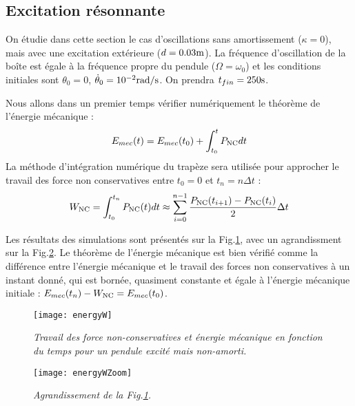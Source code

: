\documentclass[a4paper,12pt,oneside]{article}
\def \be {\begin{equation}}
\def \ee {\end{equation}}
\def \t {\theta}
\def \vt {\Dot{\theta}}
\begin{document}
\subsection{Excitation résonnante}
On étudie dans cette section le cas d'oscillations sans amortissement ($\kappa =0$), mais avec une excitation extérieure ($d=0.03\rm{m}$). La fréquence d'oscillation de la boîte est égale à la fréquence propre du pendule ($\Omega=\omega_0$) et les conditions initiales sont $\t_0=0$, $\vt_0=10^{-2} \rm{rad/s}$. On prendra $t_{fin}=250\rm{s}$.

Nous allons dans un premier temps vérifier numériquement le théorème de l'énergie mécanique :
\be
E_{mec}(t)=E_{mec}(t_0)+\int_{t_0}^{t}P_{\rm NC}dt
\ee
La méthode d'intégration numérique du trapèze sera utilisée pour approcher le travail des force non conservatives entre $t_0=0$ et $t_n=n \Delta t$ :
\be
W_{\rm NC}=\int_{t_0}^{t_n}P_{\rm NC}(t)dt \approx \sum_{i=0}^{n-1}\frac{P_{\rm NC}(t_{i+1})-P_{\rm NC}(t_{i})}{2}\Delta t
\ee

Les résultats des simulations sont présentés sur la Fig.\ref{energyW}, avec un agrandissment sur la Fig.\ref{energyWZoom}. Le théorème de l'énergie mécanique est bien vérifié comme la différence entre l'énergie mécanique et le travail des forces non conservatives à un instant donné, qui est bornée, quasiment constante et égale à l'énergie mécanique initiale : $E_{mec}(t_n)-W_{\rm{NC}}=E_{mec}(t_0)$.
\begin{figure}[H]
    \centerline{\texttt{[image: energyW]}}
\caption{ \label{energyW}\em
Travail des force non-conservatives et énergie mécanique en fonction du temps pour un pendule excité mais non-amorti.
}
\end{figure}
\begin{figure}[H]
    \centerline{\texttt{[image: energyWZoom]}}
\caption{ \label{energyWZoom}\em
Agrandissement de la Fig.\ref{energyW}.
}
\end{figure}
\end{document}
